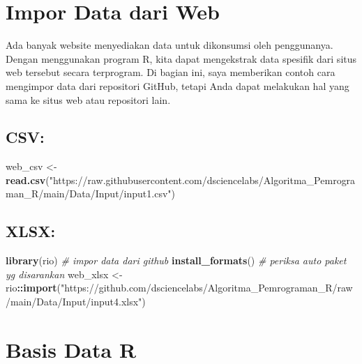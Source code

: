 \documentclass[
]{book}
\newenvironment{Shaded}{\begin{snugshade}}{\end{snugshade}}
\newcommand{\CommentTok}[1]{\textcolor[rgb]{0.56,0.35,0.01}{\textit{#1}}}
\newcommand{\FunctionTok}[1]{\textcolor[rgb]{0.13,0.29,0.53}{\textbf{#1}}}
\newcommand{\NormalTok}[1]{#1}
\newcommand{\OtherTok}[1]{\textcolor[rgb]{0.56,0.35,0.01}{#1}}
\newcommand{\SpecialCharTok}[1]{\textcolor[rgb]{0.81,0.36,0.00}{\textbf{#1}}}
\newcommand{\StringTok}[1]{\textcolor[rgb]{0.31,0.60,0.02}{#1}}
\begin{document}
\hypertarget{impor-data-dari-web}{%
\section{Impor Data dari Web}\label{impor-data-dari-web}}

Ada banyak website menyediakan data untuk dikonsumsi oleh penggunanya. Dengan menggunakan program R, kita dapat mengekstrak data spesifik dari situs web tersebut secara terprogram. Di bagian ini, saya memberikan contoh cara mengimpor data dari repositori GitHub, tetapi Anda dapat melakukan hal yang sama ke situs web atau repositori lain.

\hypertarget{csv}{%
\subsection{CSV:}\label{csv}}

\begin{Shaded}
\begin{Highlighting}[]
\NormalTok{web\_csv }\OtherTok{\textless{}{-}} \FunctionTok{read.csv}\NormalTok{(}\StringTok{"https://raw.githubusercontent.com/dsciencelabs/Algoritma\_Pemrograman\_R/main/Data/Input/input1.csv"}\NormalTok{)}
\end{Highlighting}
\end{Shaded}

\hypertarget{xlsx}{%
\subsection{XLSX:}\label{xlsx}}

\begin{Shaded}
\begin{Highlighting}[]
\FunctionTok{library}\NormalTok{(rio)                          }\CommentTok{\# impor data dari github}
\FunctionTok{install\_formats}\NormalTok{()                     }\CommentTok{\# periksa auto paket yg disarankan}
\NormalTok{web\_xlsx }\OtherTok{\textless{}{-}}\NormalTok{rio}\SpecialCharTok{::}\FunctionTok{import}\NormalTok{(}\StringTok{"https://github.com/dsciencelabs/Algoritma\_Pemrograman\_R/raw/main/Data/Input/input4.xlsx"}\NormalTok{)}
\end{Highlighting}
\end{Shaded}

\hypertarget{basis-data-r}{%
\section{Basis Data R}\label{basis-data-r}}
\end{document}
